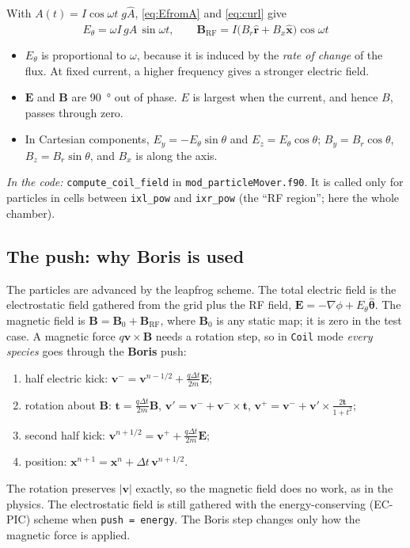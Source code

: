 \documentclass[11pt,a4paper]{article}
\newcommand{\Ahat}{\hat{A}}
\newcommand{\code}[1]{\texttt{#1}}
\newcommand{\incode}[1]{\par\smallskip\noindent\textit{In the code:} #1\par\smallskip}
\begin{document}
With $A(t) = I\cos\omega t\;g\Ahat$, \eqref{eq:EfromA} and \eqref{eq:curl}
give
\begin{equation}
  \boxed{\;
  E_\theta = \omega I\,g\Ahat\,\sin\omega t, \qquad
  \mathbf B_{\mathrm{RF}} = I\big(B_r\hat{\mathbf r} + B_x\hat{\mathbf x}\big)\cos\omega t
  \;}
  \label{eq:fields}
\end{equation}
\begin{itemize}
  \item $E_\theta$ is proportional to $\omega$, because it is induced by the
        \emph{rate of change} of the flux. At fixed current, a higher
        frequency gives a stronger electric field.
  \item $\mathbf E$ and $\mathbf B$ are \SI{90}{\degree} out of phase. $E$
        is largest when the current, and hence $B$, passes through zero.
  \item In Cartesian components,
        $E_y = -E_\theta\sin\theta$ and $E_z = E_\theta\cos\theta$;
        $B_y = B_r\cos\theta$, $B_z = B_r\sin\theta$, and $B_x$ is along the axis.
\end{itemize}

\incode{\code{compute\_coil\_field} in \code{mod\_particleMover.f90}. It is
called only for particles in cells between \code{ixl\_pow} and
\code{ixr\_pow} (the ``RF region''; here the whole chamber).}

\subsection{The push: why Boris is used}

The particles are advanced by the leapfrog scheme. The total electric field
is the electrostatic field gathered from the grid plus the RF field,
$\mathbf E = -\nabla\phi + E_\theta\hat{\boldsymbol\theta}$. The magnetic
field is $\mathbf B = \mathbf B_0 + \mathbf B_{\mathrm{RF}}$, where
$\mathbf B_0$ is any static map; it is zero in the test case. A magnetic
force $q\mathbf v\times\mathbf B$ needs a rotation step, so in \code{Coil}
mode \emph{every species} goes through the \textbf{Boris} push:
\begin{enumerate}
  \item half electric kick:
        $\mathbf v^- = \mathbf v^{n-1/2} + \frac{q\Delta t}{2m}\mathbf E$;
  \item rotation about $\mathbf B$:
        $\mathbf t = \frac{q\Delta t}{2m}\mathbf B$,
        $\mathbf v' = \mathbf v^- + \mathbf v^-\times\mathbf t$,
        $\mathbf v^+ = \mathbf v^- + \mathbf v'\times\frac{2\mathbf t}{1+t^2}$;
  \item second half kick:
        $\mathbf v^{n+1/2} = \mathbf v^+ + \frac{q\Delta t}{2m}\mathbf E$;
  \item position:
        $\mathbf x^{n+1} = \mathbf x^n + \Delta t\,\mathbf v^{n+1/2}$.
\end{enumerate}
The rotation preserves $|\mathbf v|$ exactly, so the magnetic field does no
work, as in the physics. The electrostatic field is still gathered with
the energy-conserving (EC-PIC) scheme when \code{push = energy}. The Boris
step changes only how the magnetic force is applied.
\end{document}
